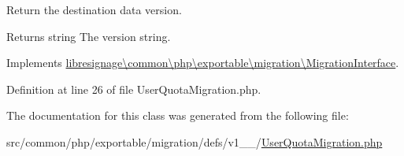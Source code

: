 Return the destination data version.

\begin{DoxyReturn}{Returns}
string The version string. 
\end{DoxyReturn}


Implements \hyperlink{interfacelibresignage_1_1common_1_1php_1_1exportable_1_1migration_1_1MigrationInterface_a9eddabf63771d4d1081bd6d067c7dff5}{libresignage\textbackslash{}common\textbackslash{}php\textbackslash{}exportable\textbackslash{}migration\textbackslash{}\+Migration\+Interface}.



Definition at line 26 of file User\+Quota\+Migration.\+php.



The documentation for this class was generated from the following file\+:\begin{DoxyCompactItemize}
\item 
src/common/php/exportable/migration/defs/v1\+\_\+\_/\hyperlink{v1__1__0_2UserQuotaMigration_8php}{User\+Quota\+Migration.\+php}\end{DoxyCompactItemize}
